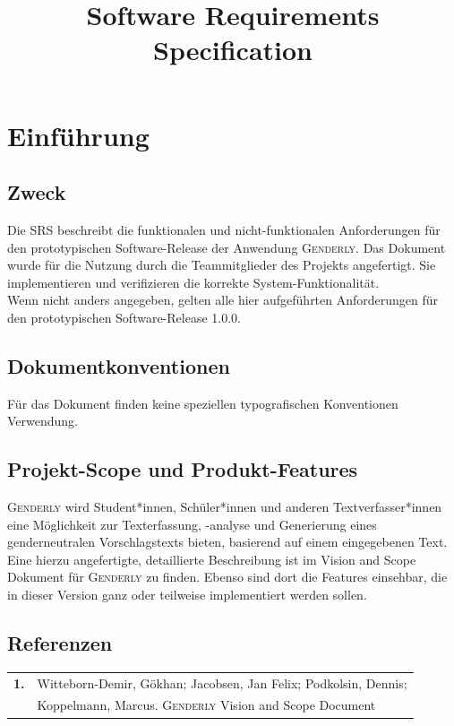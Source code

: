 \documentclass[paper=a4, parskip=half]{scrreprt}
\newcommand{\Genderly}{\textsc{Genderly}}
\begin{document}
\title{Software Requirements Specification} %



%

\chapter{Einführung}

\section{Zweck}
Die \ac{SRS} beschreibt die funktionalen und nicht-funktionalen Anforderungen für den prototypischen Software-Release der Anwendung \Genderly{}. Das Dokument wurde für die Nutzung durch die Teammitglieder des Projekts angefertigt. Sie implementieren und verifizieren die korrekte System-Funktionalität.\\
Wenn nicht anders angegeben, gelten alle hier aufgeführten Anforderungen für  den prototypischen Software-Release 1.0.0.

\section{Dokumentkonventionen}
Für das Dokument finden keine speziellen typografischen Konventionen Verwendung.

\section{Projekt-Scope und Produkt-Features}
\Genderly{} wird Student*innen, Schüler*innen und anderen Textverfasser*innen eine Möglichkeit zur Texterfassung, -analyse und Generierung eines genderneutralen Vorschlagstexts bieten, basierend auf einem eingegebenen Text. Eine hierzu angefertigte, detaillierte Beschreibung ist im Vision and Scope Dokument für \Genderly{} zu finden. Ebenso sind dort die Features einsehbar, die in dieser Version ganz oder teilweise implementiert werden sollen.

\section{Referenzen}
\begin{table}[hbt!]
\begin{tabular}{ll}
\textbf{1.} & Witteborn-Demir, Gökhan; Jacobsen, Jan Felix; Podkolsin, Dennis;\\
   &Koppelmann, Marcus. \Genderly{} Vision and Scope Document
\end{tabular}
\end{table}
\end{document}
